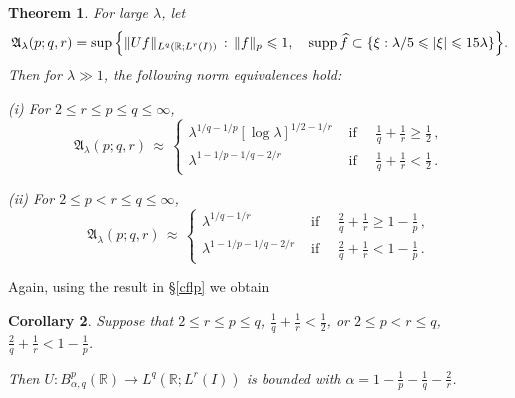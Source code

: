 \documentclass[11pt]{amsart}
\newtheorem{theorem}{Theorem}[section]
\newtheorem{corollary}[theorem]{Corollary}
\theoremstyle{definition}
\numberwithin{theorem}{section}
\numberwithin{definition}{section}
\numberwithin{equation}{section}
\newcommand{\R}{\mathbb{R}}
\renewcommand{\le}{\leqslant}
\renewcommand{\ge}{\geqslant}
\def\R{\mathbb R}
\def\supp{{\text{\rm supp\,}}}
\def\la{\lambda}             \def\La{\Lambda}
\def\fA{{\mathfrak {A}}}
\def\bbR{{\mathbb {R}}}
\renewcommand{\le}{\leqslant}
\renewcommand{\ge}{\geqslant}
\begin{document}
%

\begin{theorem}\label{onedimp-prec}
For large $\la$, let
\begin{equation*}
\fA_\la(p;q,r)=\sup\Big\{ \|Uf \|_{L^q(\bbR; L^r(I))}\, :\,
\|f\|_p\le 1, \quad \supp \widehat f\subset\{\xi: \la/5 \le
|\xi|\le 15\la\}\Big\}.
\end{equation*} Then
for  $\la\gg 1$,
 the following norm equivalences hold:

(i) For  $2\le r\le p\le q\le \infty$,
$$\fA_\la(p;q,r)\,\approx\, \begin{cases}
\la^{1/q-1/p} [\log \la]^{1/2-1/r}
&\text{ if }\quad \frac 1q+\frac 1r \ge \frac 12\, ,\\
\la^{1-1/p-1/q-2/r} &\text{ if }\quad \frac 1q+\frac 1r < \frac 12\, .
\end{cases}$$

(ii) For   $2\le p<r\le q\le \infty$,
$$\fA_\la(p;q,r)\,\approx\, \begin{cases}
\la^{1/q-1/r}
&\text{ if }\quad \frac 2q+\frac 1r \ge 1-\frac 1p\, , \\
\la^{1-1/p-1/q-2/r} &\text{ if }\quad \frac 2q+\frac 1r < 1-\frac 1p\, .
\end{cases}$$
\end{theorem}



Again,  using the result in \S\ref{cflp} we obtain

\begin{corollary}\label{sobcor1} Suppose that $2\le r\le p\le q$, $\frac 1q+\frac 1r<\frac 12$,
or  $2\le p< r\le q$, $\frac 2q+\frac 1r<1-\frac 1p$.

\noindent Then $U: B^p_{\alpha,q}(\bbR)\to L^q(\R;L^r(I))$ is
bounded with $\alpha=1-\frac 1p-\frac 1q-\frac 2r$.
\end{corollary}
\end{document}
